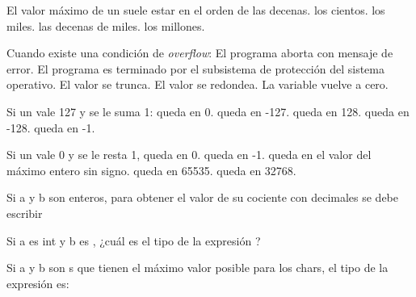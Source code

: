\begin{preguntas}
\question El valor máximo de un  suele estar en el orden de
\choice las decenas.
\correctchoice los cientos.
\choice los miles.
\choice las decenas de miles.
\choice los millones.

\question Cuando existe una condición de \textit{overflow}:
\choice El programa aborta con mensaje de error.
\choice El programa es terminado por el subsistema de protección del sistema operativo.
\correctchoice El valor se trunca.
\choice El valor se redondea.
\choice La variable vuelve a cero.

\question Si un  vale 127 y se le suma 1:
\choice queda en 0.
\choice queda en -127.
\choice queda en 128.
\correctchoice queda en -128.
\choice queda en -1.

\question Si un  vale 0 y se le resta 1,
\choice queda en 0.
\choice queda en -1.
\correctchoice queda en el valor del máximo entero sin signo.
\choice queda en 65535.
\choice queda en 32768.

\question Si a y b son enteros, para obtener el valor de su cociente con decimales se debe escribir
\choice {}
\choice {}
\correctchoice {}
\choice {}
\choice {}

\question Si a es int y b es , ¿cuál es el tipo de la expresión ?
\correctchoice {}
\choice {}
\choice {}

\question Si a y b son s que tienen el máximo valor posible para los chars, el tipo de la expresión  es:
\choice {}
\choice {}
\choice {}
\correctchoice {}
\end{preguntas}
